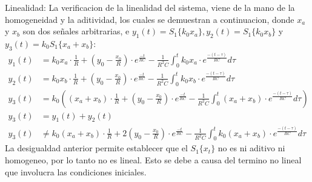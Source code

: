 \documentclass[12pt,a4paper]{report}
\begin{document}
\begin{enumerate}[label=\alph*)]
      Linealidad: La verificacion de la linealidad del sistema, viene de la mano de la homogeneidad y la aditividad,
      los cuales se demuestran a continuacion, donde $x_a$ y $x_b$ son dos señales arbitrarias, e $y_1(t) = S_1\{k_0x_a\},
      y_2(t) = S_1\{k_0x_b\}$ y $y_3(t) = k_0S_1\{x_a + x_b\}$:
      \begin{align*}
        y_1(t) &= k_0x_a \cdot \frac{1}{R} + \left(y_0 - \frac{x_0}{R}\right) \cdot
          e^{\frac{-t}{RC}} - \frac{1}{R^2C} \int_{0}^{t} k_0x_a \cdot e^{\frac{-(t-\tau)}{RC}} d\tau\\[12pt]
        y_2(t) &= k_0x_b \cdot \frac{1}{R} + \left(y_0 - \frac{x_0}{R}\right) \cdot
          e^{\frac{-t}{RC}} - \frac{1}{R^2C} \int_{0}^{t} k_0x_b \cdot e^{\frac{-(t-\tau)}{RC}} d\tau\\[12pt]
        y_3(t) &= k_0\left((x_a + x_b) \cdot \frac{1}{R} + \left(y_0 - \frac{x_0}{R}\right) \cdot e^{\frac{-t}{RC}} -
          \frac{1}{R^2C} \int_{0}^{t} (x_a + x_b) \cdot e^{\frac{-(t-\tau)}{RC}} d\tau\right)\\[12pt]
        y_3(t) &= y_1(t) + y_2(t)\\[6pt]
        y_3(t) &\neq k_0(x_a + x_b) \cdot \frac{1}{R} + 2\left(y_0 - \frac{x_0}{R}\right) \cdot
          e^{\frac{-t}{RC}} - \frac{1}{R^2C} \int_{0}^{t} k_0(x_a + x_b) \cdot e^{\frac{-(t-\tau)}{RC}} d\tau
      \end{align*}
      La desigualdad anterior permite establecer que el $S_1\{x_t\}$ no es ni aditivo ni homogeneo, por lo tanto no es
      lineal. Esto se debe a causa del termino no lineal que involucra las condiciones iniciales.\\


\end{enumerate}
\end{document}
